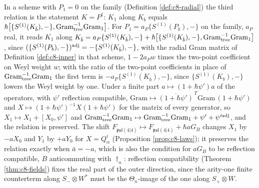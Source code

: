 \begin{corollary}[The test $Q^\dagger=S$ in Gram form]
In a scheme with $P_1=0$ on the family (Definition \ref{def:c8-radial}) the third relation is the statement $K=P^\dagger$: $K_1$ along $K_{\bar b}$ equals $\hbar\big[\{S^{(1)}(K_{\bar b}),-\},\mathrm{Gram}_{\rm tree}^{-1}\mathrm{Gram}_{\rm 1}\big]$. For $P_1=a_P\{S^{(1)}(P_b),-\}$ on the family, $a_P$ real, it reads $K_1$ along $K_{\bar b}=a_P\{S^{(1)}(K_{\bar b}),-\}+\hbar\big[\{S^{(1)}(K_{\bar b}),-\},\mathrm{Gram}_{\rm tree}^{-1}\mathrm{Gram}_{\rm 1}\big]$, since $(\{S^{(1)}(P_b),-\})^{\rm adj}=-\{S^{(1)}(K_{\bar b}),-\}$, with the radial Gram matrix of Definition \ref{def:c8-inner} in that scheme, $1-2a_Pw$ times the two-point coefficient on Weyl weight $w$; with the ratio of the two-point coefficients in place of $\mathrm{Gram}_{\rm tree}^{-1}\mathrm{Gram}_{\rm 1}$ the first term is $-a_P\{S^{(1)}(K_{\bar b}),-\}$, since $\{S^{(1)}(K_b),-\}$ lowers the Weyl weight by one. Under a finite part $a\mapsto(1+\hbar\psi')a$ of the operators, with $\psi'$ reflection compatible, $\mathrm{Gram}\mapsto\overline{(1+\hbar\psi')}^{\,T}\mathrm{Gram}\,(1+\hbar\psi')$ and $X\mapsto(1+\hbar\psi')^{-1}X(1+\hbar\psi')$ for the matrix of every generator, so $X_1\mapsto X_1+[X_0,\psi']$ and $\mathrm{Gram}_{\rm tree}^{-1}\mathrm{Gram}_{\rm 1}\mapsto\mathrm{Gram}_{\rm tree}^{-1}\mathrm{Gram}_{\rm 1}+\psi'+\psi'^{\rm adj}$, and the relation is preserved. The shift $F_{\mathfrak{psl}(4|4)}\mapsto F_{\mathfrak{psl}(4|4)}+\hbar aG_B$ changes $X_1$ by $-aX_0$ and $Y_1$ by $+aY_0$ for $X=Q^i_\alpha$ (Proposition \ref{prop:c8-laws}); it preserves the relation exactly when $\bar a=-a$, which is also the condition for $aG_B$ to be reflection compatible, $B$ anticommuting with $\dagger_n$: reflection compatibility (Theorem \ref{thm:c8-fields}) fixes the real part of the outer direction, since the arity-one finite counterterm along $S_-\otimes W^*$ must be the $\Theta_n$-image of the one along $S_+\otimes W$.
\end{corollary}

